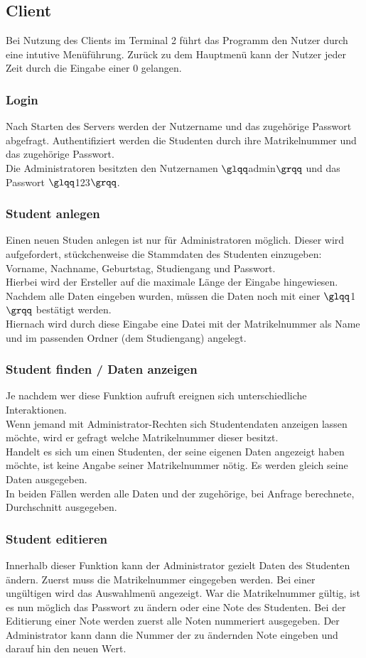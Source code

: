 \documentclass{scrartcl}
\begin{document}
	\subsection{Client}
		Bei Nutzung des Clients im Terminal 2 führt das Programm den Nutzer durch eine intutive Menüführung. Zurück zu dem Hauptmenü kann der Nutzer jeder Zeit durch die Eingabe einer 0 gelangen.
		\subsubsection{Login}
			Nach Starten des Servers werden der Nutzername und das zugehörige Passwort abgefragt. Authentifiziert werden die Studenten durch ihre Matrikelnummer und das zugehörige Passwort. \\
			Die Administratoren besitzten den Nutzernamen $\glqq$admin$\grqq$ und das Passwort $\glqq$123$\grqq$.
		\subsubsection{Student anlegen}
			Einen neuen Studen anlegen ist nur für Administratoren möglich. Dieser wird aufgefordert, stückchenweise die Stammdaten des Studenten einzugeben: Vorname, Nachname, Geburtstag, Studiengang und Passwort.\\
			Hierbei wird der Ersteller auf die maximale Länge der Eingabe hingewiesen. Nachdem alle Daten eingeben wurden, müssen die Daten noch mit einer $\glqq$1$\grqq$ bestätigt werden.\\
			Hiernach wird durch diese Eingabe  eine Datei mit der Matrikelnummer als Name und im passenden Ordner (dem Studiengang) angelegt.
		\subsubsection{Student finden / Daten anzeigen}
			Je nachdem wer diese Funktion aufruft ereignen sich unterschiedliche Interaktionen. \\
			Wenn jemand mit Administrator-Rechten sich Studentendaten anzeigen lassen möchte, wird er gefragt welche Matrikelnummer dieser besitzt.\\
			Handelt es sich um einen Studenten, der seine eigenen Daten angezeigt haben möchte, ist keine Angabe seiner Matrikelnummer nötig. Es werden gleich seine Daten ausgegeben.\\
			In beiden Fällen werden alle Daten und der zugehörige, bei Anfrage berechnete, Durchschnitt ausgegeben.
		\subsubsection{Student editieren}
			Innerhalb dieser Funktion kann der Administrator gezielt Daten des Studenten ändern. Zuerst muss die Matrikelnummer eingegeben werden. Bei einer ungültigen wird das Auswahlmenü angezeigt. War die Matrikelnummer gültig, ist es nun möglich das Passwort zu ändern oder eine Note des Studenten. Bei der Editierung einer Note werden zuerst alle Noten nummeriert ausgegeben. Der Administrator kann dann die Nummer der zu ändernden Note eingeben und darauf hin den neuen Wert. 
\end{document}
